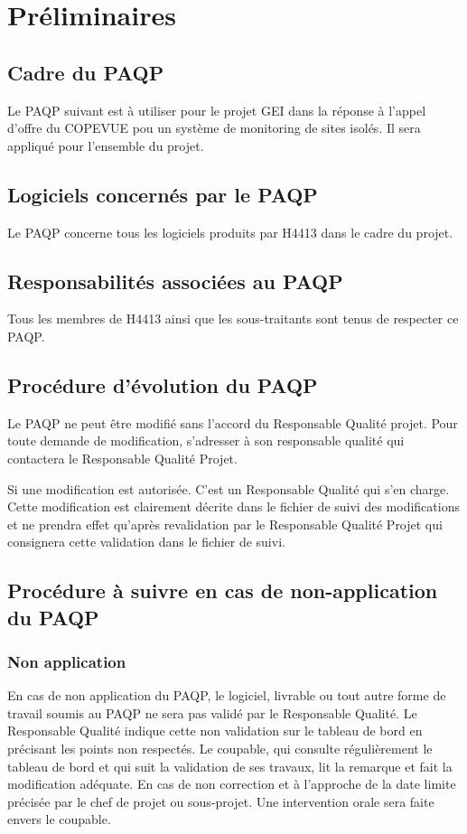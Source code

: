 
\section{Préliminaires}
    \subsection{Cadre du PAQP}
    Le PAQP suivant est à utiliser pour le projet GEI dans la réponse à l'appel 
d'offre du COPEVUE pou un système de monitoring de sites isolés.
Il sera appliqué pour l'ensemble du projet.
    \subsection{Logiciels concernés par le PAQP}
    Le PAQP concerne tous les logiciels produits par H4413 dans le cadre du
projet.
    \subsection{Responsabilités associées au PAQP}
    Tous les membres de H4413 ainsi que les sous-traitants sont tenus de
respecter ce PAQP.
    \subsection{Procédure d'évolution du PAQP}
    Le PAQP ne peut être modifié sans l'accord du Responsable Qualité projet.
    Pour toute demande de modification, s'adresser à son responsable qualité qui 
contactera le Responsable Qualité Projet.
    
    Si une modification est autorisée. C'est un Responsable Qualité qui s'en charge.
    Cette modification est clairement décrite dans le fichier de suivi des 
modifications et ne prendra effet qu'après revalidation par le Responsable 
Qualité Projet qui consignera cette validation dans le fichier de suivi.
    \subsection{Procédure à  suivre en cas de non-application du PAQP}
    \subsubsection{Non application}

    En cas de non application du PAQP, le logiciel, livrable ou tout autre forme 
de travail soumis au PAQP ne sera pas validé par le Responsable Qualité.
    Le Responsable Qualité indique cette non validation sur le tableau de bord 
en précisant les points non respectés.
    Le coupable, qui consulte régulièrement le tableau de bord et qui suit la 
validation de ses travaux, lit la remarque et fait la modification adéquate.
    En cas de non correction et à l'approche de la date limite précisée par le 
chef de projet ou sous-projet. Une intervention orale sera faite envers le 
coupable.

